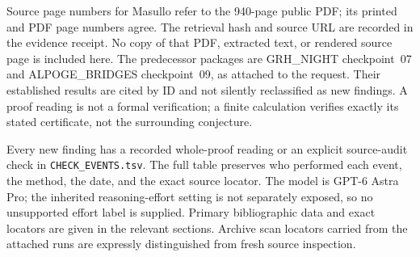 \documentclass[11pt,a4paper]{article}
\begin{document}
Source page numbers for Masullo refer to the 940-page public PDF;
its printed and PDF page numbers agree. The retrieval hash and
source URL are recorded in the evidence receipt. No copy of that
PDF, extracted text, or rendered source page is included here.
The predecessor packages are GRH\_NIGHT checkpoint~07 and
ALPOGE\_BRIDGES checkpoint~09, as attached to the request.
Their established results are cited by ID and not silently
reclassified as new findings. A proof reading is not a formal
verification; a finite calculation verifies exactly its stated
certificate, not the surrounding conjecture.

Every new finding has a recorded whole-proof reading or an
explicit source-audit check in \texttt{CHECK\_EVENTS.tsv}.
The full table preserves who performed each event, the method,
the date, and the exact source locator. The model is GPT-6 Astra
Pro; the inherited reasoning-effort setting is not separately
exposed, so no unsupported effort label is supplied. Primary
bibliographic data and exact locators are given in the relevant
sections. Archive scan locators carried from the attached runs
are expressly distinguished from fresh source inspection.
\end{document}

